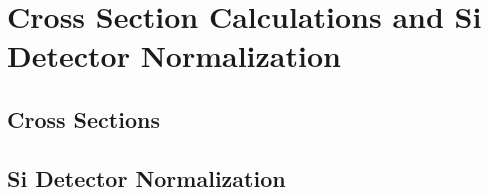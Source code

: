 



\section{Cross Section Calculations and Si Detector Normalization} \label{sec:cs_calc}


\subsection{Cross Sections}

\subsection{Si Detector Normalization}


